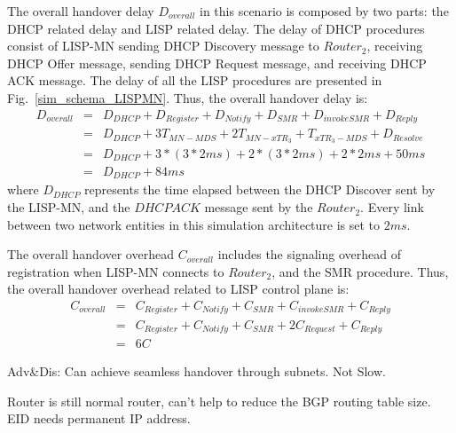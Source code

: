 The overall handover delay $D_{overall}$ in this scenario is composed by two parts: the DHCP related delay and LISP related delay. The delay of DHCP procedures consist of LISP-MN sending DHCP Discovery message to $Router_2$, receiving DHCP Offer message, sending DHCP Request message, and receiving DHCP ACK message. The delay of all the LISP procedures are presented in Fig.~\ref{sim_schema_LISPMN}. Thus, the overall handover delay is:
\begin{eqnarray}
D_{overall} &=& D_{DHCP} + D_{Register} + D_{Notify} + D_{SMR} + D_{invokeSMR} + D_{Reply} \nonumber \\
&=& D_{DHCP} + 3T_{MN-MDS} + 2T_{MN-xTR_3} + T_{xTR_3-MDS} + D_{Resolve} \nonumber \\
&=& D_{DHCP} + 3* (3*2ms) + 2*(3*2ms) + 2*2ms + 50ms\nonumber \\
&=& D_{DHCP} + 84 ms
\end{eqnarray}
where $D_{DHCP}$ represents the time elapsed between the DHCP Discover sent by the LISP-MN, and the $DHCP ACK$ message sent by the $Router_2$. Every link between two network entities in this simulation architecture is set to $2 ms$. %

The overall handover overhead $C_{overall}$ includes the signaling overhead of registration when LISP-MN connects to $Router_2$, and the SMR procedure. Thus, the overall handover overhead related to LISP control plane is:
\begin{eqnarray}
C_{overall} &=& C_{Register} + C_{Notify} + C_{SMR} + C_{invokeSMR} + C_{Reply} \nonumber \\
&=& C_{Register} + C_{Notify} + C_{SMR} + 2C_{Request} + C_{Reply} \nonumber \\
&=& 6C
\end{eqnarray}

Adv\&Dis: Can achieve seamless handover through subnets. Not Slow.

Router is still normal router, can't help to reduce the BGP routing table size. EID needs permanent IP address.

